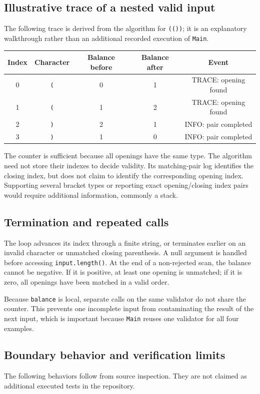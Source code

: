 \documentclass[12pt,a4paper]{article}
\newcommand{\code}[1]{\texttt{#1}}
\begin{document}
\subsection{Illustrative trace of a nested valid input}
The following trace is derived from the algorithm for \code{(())}; it is an explanatory walkthrough rather than an additional recorded execution of \code{Main}.

\begin{center}\small
\begin{tabular}{@{}ccccc@{}}
\toprule
\textbf{Index} & \textbf{Character} & \textbf{Balance before} & \textbf{Balance after} & \textbf{Event}\\
\midrule
0 & \code{(} & 0 & 1 & TRACE: opening found\\
1 & \code{(} & 1 & 2 & TRACE: opening found\\
2 & \code{)} & 2 & 1 & INFO: pair completed\\
3 & \code{)} & 1 & 0 & INFO: pair completed\\
\bottomrule
\end{tabular}
\end{center}
The counter is sufficient because all openings have the same type. The algorithm need not store their indexes to decide validity. Its matching-pair log identifies the closing index, but does not claim to identify the corresponding opening index. Supporting several bracket types or reporting exact opening/closing index pairs would require additional information, commonly a stack.

\subsection{Termination and repeated calls}
The loop advances its index through a finite string, or terminates earlier on an invalid character or unmatched closing parenthesis. A null argument is handled before accessing \code{input.length()}. At the end of a non-rejected scan, the balance cannot be negative. If it is positive, at least one opening is unmatched; if it is zero, all openings have been matched in a valid order.

Because \code{balance} is local, separate calls on the same validator do not share the counter. This prevents one incomplete input from contaminating the result of the next input, which is important because \code{Main} reuses one validator for all four examples.

\subsection{Boundary behavior and verification limits}
The following behaviors follow from source inspection. They are not claimed as additional executed tests in the repository.
\end{document}

